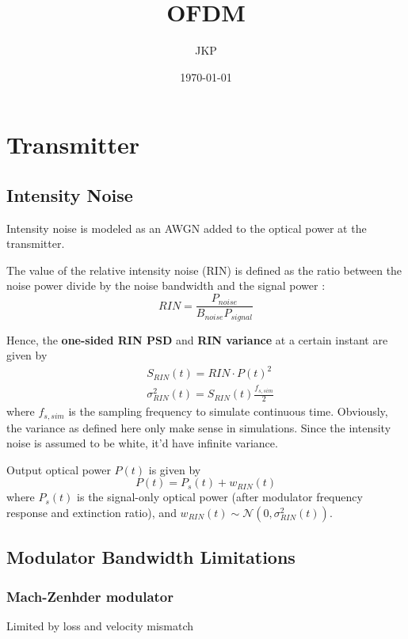 \documentclass[a4paper]{article}
\title{OFDM}
\author{JKP}
\date{\today}
\begin{document}
\maketitle

\section{Transmitter}
\subsection{Intensity Noise}
Intensity noise is modeled as an AWGN added to the optical power at the transmitter.

The value of the relative intensity noise (RIN) is defined as the ratio between the noise power divide by the noise bandwidth and the signal power \cite{agilent-RIN-measurement}: 
\begin{equation}
RIN = \frac{P_{noise}}{B_{noise}P_{signal}}
\end{equation}

Hence, the \textbf{one-sided RIN PSD} and \textbf{RIN variance} at a certain instant are given by
\begin{align}
& S_{RIN}(t) = RIN\cdot P(t)^2 \\
& \sigma^2_{RIN}(t) = S_{RIN}(t)\frac{f_{s, sim}}{2}
\end{align}
where $f_{s, sim}$ is the sampling frequency to simulate continuous time. Obviously, the variance as defined here only make sense in simulations. Since the intensity noise is assumed to be white, it'd have infinite variance.

Output optical power $P(t)$ is given by
\begin{equation}
P(t) = P_s(t) + w_{RIN}(t)
\end{equation}
where $P_s(t)$ is the signal-only optical power (after modulator frequency response and extinction ratio), and $w_{RIN}(t)\sim\mathcal{N}(0, \sigma^2_{RIN}(t))$.

\subsection{Modulator Bandwidth Limitations}

\subsubsection{Mach-Zenhder modulator}
\cite{Barros2009, Ho2005}

Limited by loss and velocity mismatch
\end{document}
